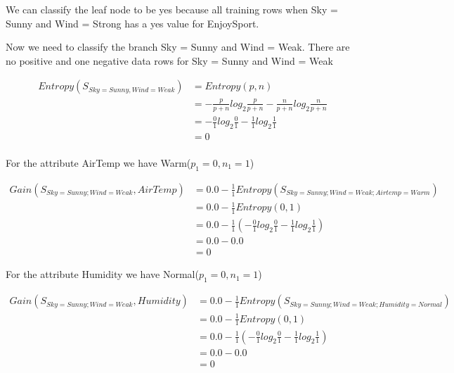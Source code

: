 \documentclass[10pt,a4paper]{article}
\begin{document}
{{{{{{{{{{We can classify the leaf node to be yes because all training rows when Sky = Sunny and Wind = Strong has a yes value for EnjoySport.

Now we need to classify the branch Sky = Sunny and Wind = Weak. There are no positive and one negative data rows for Sky = Sunny and Wind = Weak

\begin{equation}
\begin{split}
Entropy(S_{Sky=Sunny,Wind=Weak}) &= Entropy(p,n) \\
                       &= -\frac{p}{p+n}log_2\frac{p}{p+n} - \frac{n}{p+n}log_2\frac{n}{p+n}  \\
                       &= -\frac{0}{1} log_2\frac{0}{1} -\frac{1}{1} log_2\frac{1}{1} \\
                       &= 0   \\
\end{split}
\end{equation}

For the attribute AirTemp we have Warm($p_1=0,n_1=1$)
 
\begin{equation}
\begin{split}
Gain(S_{Sky=Sunny;Wind=Weak},AirTemp) &= 0.0 - \frac{1}{1} Entropy(S_{Sky=Sunny;Wind=Weak;Airtemp=Warm} )\\
          &= 0.0 - \frac{1}{1} Entropy(0,1) \\
          &= 0.0 - \frac{1}{1}( -\frac{0}{1} log_2\frac{0}{1} -\frac{1}{1} log_2\frac{1}{1} ) \\
          &= 0.0 - 0.0  \\
          &= 0
\end{split}
\end{equation}

For the attribute Humidity we have Normal($p_1=0,n_1=1$)
 
\begin{equation}
\begin{split}
Gain(S_{Sky=Sunny;Wind=Weak},Humidity) &= 0.0 - \frac{1}{1} Entropy(S_{Sky=Sunny;Wind=Weak;Humidity=Normal} )\\
          &= 0.0 - \frac{1}{1} Entropy(0,1) \\
          &= 0.0 - \frac{1}{1}( -\frac{0}{1} log_2\frac{0}{1} -\frac{1}{1} log_2\frac{1}{1} ) \\
          &= 0.0 - 0.0  \\
          &= 0
\end{split}
\end{equation}

}}}}}}}}}}
\end{document}
